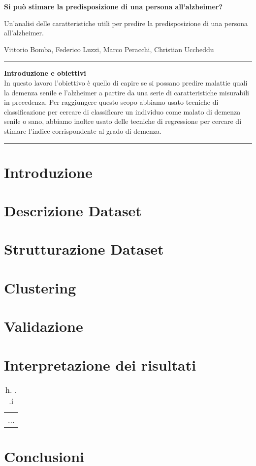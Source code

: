 \documentclass[10pt, a4paper,openany]{article}
\begin{document}
\begin{center}
\huge\textbf{\textcolor{ultramarine}{Si può stimare la predisposizione di una persona all'alzheimer?}}

Un'analisi delle caratteristiche utili per predire la predisposizione di una persona all'alzheimer.
\end{center}

\begin{center}
Vittorio Bomba, Federico Luzzi,  Marco Peracchi, Christian Uccheddu
\end{center}

\hrule
\vspace{0.3cm}

\begin{center}\textbf{{Introduzione e obiettivi}}
\\
In questo lavoro l'obiettivo è quello di capire se si possano predire malattie quali la demenza senile e l'alzheimer a partire da una serie di caratteristiche misurabili in precedenza. Per raggiungere questo scopo abbiamo usato tecniche di classificazione per cercare di classificare un individuo come malato di demenza senile o sano, abbiamo inoltre usato delle tecniche di regressione per cercare di stimare l'indice corrispondente al grado di demenza.
\vspace{0.3cm}
\hrule
\end{center}
\begin{multicols}{2}
	
\section*{Introduzione}
\section*{Descrizione Dataset}
\section*{Strutturazione Dataset}
\section*{Clustering}
\section*{Validazione}
\section*{Interpretazione dei risultati}
\begin{table}
	\caption{h. . .i}
	\label{tab:esempio}
	\centering
	\begin{tabular}{H}
		...
	\end{tabular}
\end{table}
\section*{Conclusioni}

\end{multicols}
\end{document}
